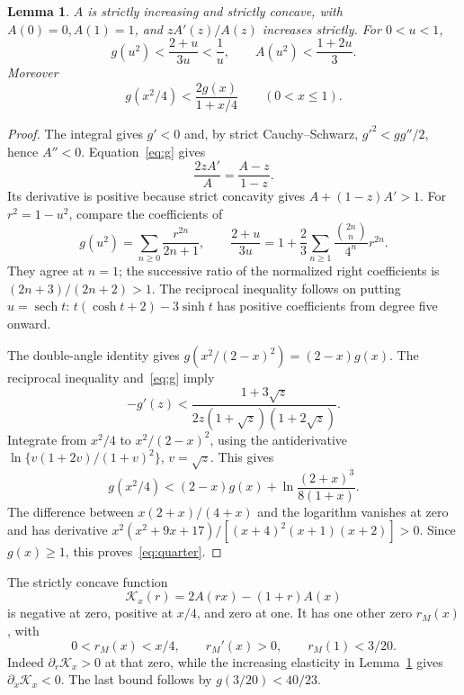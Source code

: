 \documentclass[12pt,letterpaper,onecolumn]{article}
\newtheorem{lemma}[theorem]{Lemma}
\theoremstyle{definition}
\begin{document}
\begin{lemma}\label{lem:entropy}
\(A\) is strictly increasing and strictly concave, with \(A(0)=0,A(1)=1\), and \(zA'(z)/A(z)\) increases strictly. For \(0<u<1\),
\[
g(u^2)<\frac{2+u}{3u}<\frac1u,\qquad
A(u^2)<\frac{1+2u}{3}.
\]
Moreover
\begin{equation}\label{eq:quarter}
g(x^2/4)<\frac{2g(x)}{1+x/4}\qquad(0<x\le1).
\end{equation}
\end{lemma}
\begin{proof}
The integral gives \(g'<0\) and, by strict Cauchy--Schwarz,
\(g'^2<gg''/2\), hence \(A''<0\).
Equation~\eqref{eq:g} gives
\[
\frac{2zA'}A=\frac{A-z}{1-z}.
\]
Its derivative is positive because strict concavity gives
\(A+(1-z)A'>1\).
For \(r^2=1-u^2\), compare the coefficients of
\[
g(u^2)=\sum_{n\ge0}\frac{r^{2n}}{2n+1},
\qquad \frac{2+u}{3u}
=1+\frac23\sum_{n\ge1}\frac{\binom{2n}{n}}{4^n}r^{2n}.
\]
They agree at \(n=1\); the successive ratio of the normalized right coefficients is \((2n+3)/(2n+2)>1\).
The reciprocal inequality follows on putting \(u=\operatorname{sech}t\):
\(t(\cosh t+2)-3\sinh t\) has positive coefficients from degree five onward.

The double-angle identity gives
\(g(x^2/(2-x)^2)=(2-x)g(x)\).
The reciprocal inequality and~\eqref{eq:g} imply
\[
-g'(z)<\frac{1+3\sqrt z}{2z(1+\sqrt z)(1+2\sqrt z)}.
\]
Integrate from \(x^2/4\) to \(x^2/(2-x)^2\), using the antiderivative
\(\ln\{v(1+2v)/(1+v)^2\}\), \(v=\sqrt z\). This gives
\[
g(x^2/4)<(2-x)g(x)+\ln\frac{(2+x)^3}{8(1+x)}.
\]
The difference between \(x(2+x)/(4+x)\) and the logarithm vanishes at zero and has derivative
\(x^2(x^2+9x+17)/[(x+4)^2(x+1)(x+2)]>0\).
Since \(g(x)\ge1\), this proves~\eqref{eq:quarter}.
\end{proof}

The strictly concave function
\[
\mathcal K_x(r)=2A(rx)-(1+r)A(x)
\]
is negative at zero, positive at \(x/4\), and zero at one. It has one other zero \(r_M(x)\), with
\begin{equation}\label{eq:rM}
0<r_M(x)<x/4,\qquad r_M'(x)>0,\qquad r_M(1)<3/20.
\end{equation}
Indeed \(\partial_r\mathcal K_x>0\) at that zero, while the increasing elasticity in Lemma~\ref{lem:entropy} gives \(\partial_x\mathcal K_x<0\). The last bound follows by \(g(3/20)<40/23\).
\end{document}

